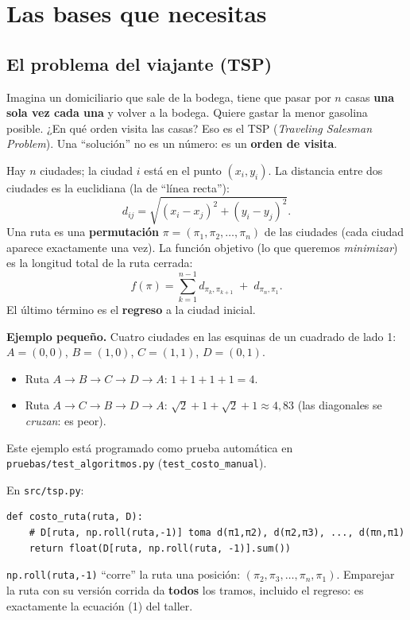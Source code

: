 \documentclass[11pt,a4paper]{article}
\newcommand{\archivo}[1]{\texttt{#1}}
\begin{document}
\section{Las bases que necesitas}\label{sec:bases}

\subsection{El problema del viajante (TSP)}

\begin{idea}
Imagina un domiciliario que sale de la bodega, tiene que pasar por $n$ casas \textbf{una sola vez cada una}
y volver a la bodega. Quiere gastar la menor gasolina posible. ¿En qué orden visita las casas?
Eso es el TSP (\emph{Traveling Salesman Problem}). Una ``solución'' no es un número: es un \textbf{orden de visita}.
\end{idea}

\begin{mate}
Hay $n$ ciudades; la ciudad $i$ está en el punto $(x_i,y_i)$. La distancia entre dos ciudades es la euclidiana (la de ``línea recta''):
\[
d_{ij}=\sqrt{(x_i-x_j)^2+(y_i-y_j)^2}.
\]
Una ruta es una \textbf{permutación} $\pi=(\pi_1,\pi_2,\dots,\pi_n)$ de las ciudades (cada ciudad aparece exactamente una vez).
La función objetivo (lo que queremos \emph{minimizar}) es la longitud total de la ruta cerrada:
\[
f(\pi)=\sum_{k=1}^{n-1} d_{\pi_k,\pi_{k+1}} \;+\; d_{\pi_n,\pi_1}.
\]
El último término es el \textbf{regreso} a la ciudad inicial.
\end{mate}

\textbf{Ejemplo pequeño.} Cuatro ciudades en las esquinas de un cuadrado de lado 1:
$A=(0,0)$, $B=(1,0)$, $C=(1,1)$, $D=(0,1)$.
\begin{itemize}
  \item Ruta $A\to B\to C\to D\to A$: $1+1+1+1=4$.
  \item Ruta $A\to C\to B\to D\to A$: $\sqrt2+1+\sqrt2+1\approx 4{,}83$ (las diagonales se \emph{cruzan}: es peor).
\end{itemize}
Este ejemplo está programado como prueba automática en \archivo{pruebas/test\_algoritmos.py} (\texttt{test\_costo\_manual}).

\begin{codigo}
En \archivo{src/tsp.py}:
\begin{lstlisting}
def costo_ruta(ruta, D):
    # D[ruta, np.roll(ruta,-1)] toma d(π1,π2), d(π2,π3), ..., d(πn,π1)
    return float(D[ruta, np.roll(ruta, -1)].sum())
\end{lstlisting}
\texttt{np.roll(ruta,-1)} ``corre'' la ruta una posición: $(\pi_2,\pi_3,\dots,\pi_n,\pi_1)$.
Emparejar la ruta con su versión corrida da \textbf{todos} los tramos, incluido el regreso: es exactamente la ecuación (1) del taller.
\end{codigo}
\end{document}
